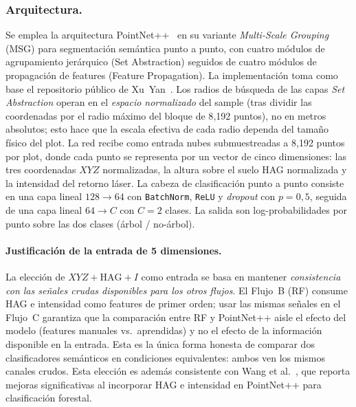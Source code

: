 \documentclass[runningheads]{llncs}
\begin{document}
\subsubsection{Arquitectura.}
Se emplea la arquitectura PointNet++~\cite{qi2017} en su variante \emph{Multi-Scale Grouping} (MSG) para segmentaci\'on sem\'antica punto a punto, con cuatro m\'odulos de agrupamiento jer\'arquico (Set Abstraction) seguidos de cuatro m\'odulos de propagaci\'on de features (Feature Propagation). La implementaci\'on toma como base el repositorio p\'ublico de Xu~Yan~\cite{yan2019pointnet2pytorch}. Los radios de b\'usqueda de las capas \emph{Set Abstraction} operan en el \emph{espacio normalizado} del sample (tras dividir las coordenadas por el radio m\'aximo del bloque de 8{,}192 puntos), no en metros absolutos; esto hace que la escala efectiva de cada radio dependa del tama\~no f\'isico del plot. La red recibe como entrada nubes submuestreadas a 8{,}192 puntos por plot, donde cada punto se representa por un vector de cinco dimensiones: las tres coordenadas $XYZ$ normalizadas, la altura sobre el suelo HAG normalizada y la intensidad del retorno l\'aser. La cabeza de clasificaci\'on punto a punto consiste en una capa lineal $128 \to 64$ con \texttt{BatchNorm}, \texttt{ReLU} y \emph{dropout} con $p = 0{,}5$, seguida de una capa lineal $64 \to C$ con $C = 2$ clases. La salida son log-probabilidades por punto sobre las dos clases (\'arbol / no-\'arbol).

\paragraph{Justificaci\'on de la entrada de 5 dimensiones.}
La elecci\'on de $XYZ + \text{HAG} + I$ como entrada se basa en mantener \emph{consistencia con las se\~nales crudas disponibles para los otros flujos}. El Flujo~B (RF) consume HAG e intensidad como features de primer orden; usar las mismas se\~nales en el Flujo~C garantiza que la comparaci\'on entre RF y PointNet++ aisle el efecto del modelo (features manuales vs.\ aprendidas) y no el efecto de la informaci\'on disponible en la entrada. Esta es la \'unica forma honesta de comparar dos clasificadores sem\'anticos en condiciones equivalentes: ambos ven los mismos canales crudos. Esta elecci\'on es adem\'as consistente con Wang et al.~\cite{wang2023}, que reporta mejoras significativas al incorporar HAG e intensidad en PointNet++ para clasificaci\'on forestal.
\end{document}
